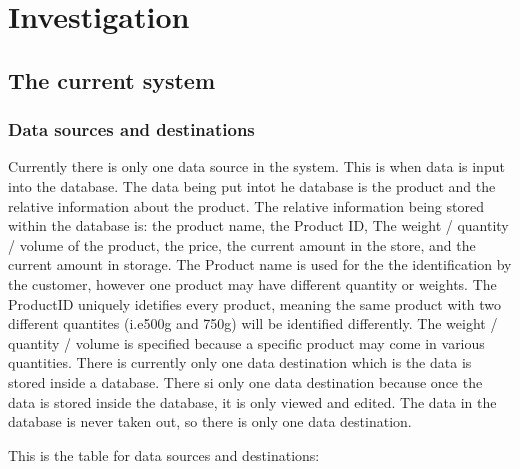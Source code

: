 \section{Investigation}


\subsection{The current system}

\subsubsection{Data sources and destinations}
	\begin{flushleft}
 Currently there is only one data source in the system.  This is when data is input into the database. The data being put intot he database is the product and the relative information about the product. The relative information being stored within the database is: the product name, the Product ID, The weight / quantity / volume of the product, the price, the current amount in the store, and the current amount in storage. The Product name is used for the the identification by the customer, however one product may have different quantity or weights. The ProductID uniquely idetifies every product, meaning the same product with two different quantites (i.e500g and 750g) will be identified differently. The weight / quantity / volume is specified because a specific product may come in various quantities. There is currently only one data destination which is the data is stored inside a database. There si only one data destination because once the data is stored inside the database, it is only viewed and edited. The data in the database is never taken out, so there is only one data destination.

This is the table for data sources and destinations:\par
	\end{flushleft}





























